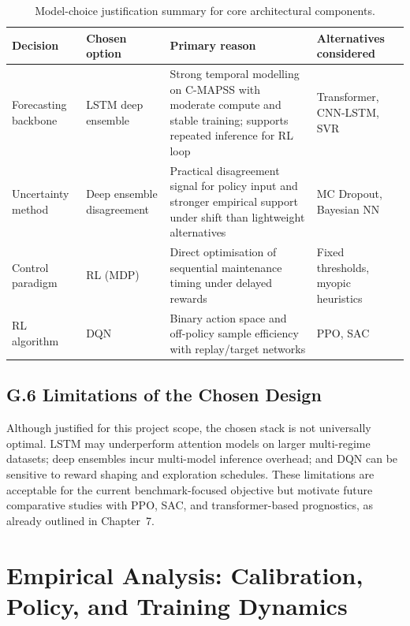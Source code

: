\documentclass[12pt,a4paper]{report}
\begin{document}
\begin{table}[h]
\centering
\small
\caption{Model-choice justification summary for core architectural components.}
\label{tab:app_model_justification}
\setlength{\tabcolsep}{4pt}
\begin{tabularx}{\textwidth}{@{}>{\raggedright\arraybackslash}p{2.3cm} >{\raggedright\arraybackslash}p{2.8cm} >{\raggedright\arraybackslash}X >{\raggedright\arraybackslash}p{2.4cm}@{}}
\toprule
\textbf{Decision} & \textbf{Chosen option} & \textbf{Primary reason} & \textbf{Alternatives considered} \\
\midrule
Forecasting backbone & LSTM deep ensemble & Strong temporal modelling on C-MAPSS with moderate compute and stable training; supports repeated inference for RL loop & Transformer, CNN-LSTM, SVR \\
Uncertainty method & Deep ensemble disagreement & Practical disagreement signal for policy input and stronger empirical support under shift than lightweight alternatives & MC Dropout, Bayesian NN \\
Control paradigm & RL (MDP) & Direct optimisation of sequential maintenance timing under delayed rewards & Fixed thresholds, myopic heuristics \\
RL algorithm & DQN & Binary action space and off-policy sample efficiency with replay/target networks & PPO, SAC \\
\bottomrule
\end{tabularx}
\end{table}

\section*{G.6 Limitations of the Chosen Design}

Although justified for this project scope, the chosen stack is not universally optimal. LSTM may underperform attention models on larger multi-regime datasets; deep ensembles incur multi-model inference overhead; and DQN can be sensitive to reward shaping and exploration schedules. These limitations are acceptable for the current benchmark-focused objective but motivate future comparative studies with PPO, SAC, and transformer-based prognostics, as already outlined in Chapter~7.


\chapter{Empirical Analysis: Calibration, Policy, and Training Dynamics}
\label{app:empirical}
\end{document}
